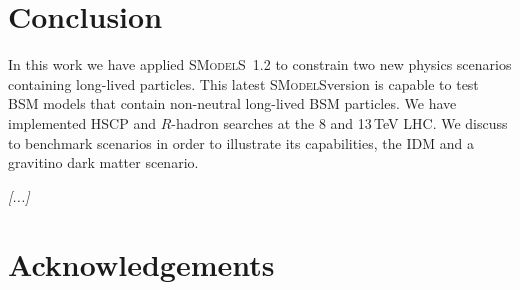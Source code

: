 \documentclass[preprint,number,sort&compress,twocolumn,3p]{elsstyarticle}
\newcommand{\GEV}{\ensuremath{\,\textnormal{GeV}}}
\newcommand{\smo}{\textsc{SModelS}}
\newcommand{\com}[1]{\emph{\color{red}[#1]}}  %
\begin{document}



%









\section{Conclusion}\label{sec:summary} 

In this work we have applied \smo~1.2 to constrain two new physics scenarios containing long-lived particles. This latest \smo version is capable to test BSM models that contain non-neutral long-lived BSM particles. We have implemented HSCP and $R$-hadron
searches at the 8 and 13\,TeV LHC\@. We discuss to benchmark scenarios in order to
illustrate its capabilities, the IDM and a gravitino dark matter scenario.

\com{...}

\section*{Acknowledgements}
\end{document}
